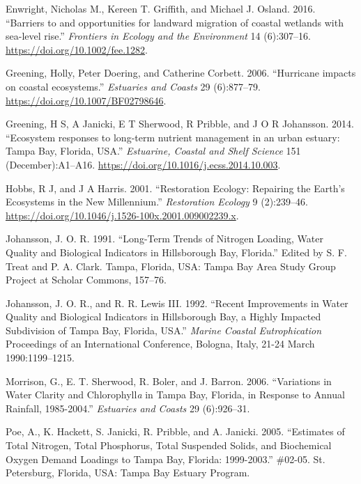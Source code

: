 \documentclass[]{article}
\begin{document}
\leavevmode\hypertarget{ref-Enwright16}{}%
Enwright, Nicholas M., Kereen T. Griffith, and Michael J. Osland. 2016.
``Barriers to and opportunities for landward migration of coastal
wetlands with sea-level rise.'' \emph{Frontiers in Ecology and the
Environment} 14 (6):307--16. \url{https://doi.org/10.1002/fee.1282}.

\leavevmode\hypertarget{ref-Greening06b}{}%
Greening, Holly, Peter Doering, and Catherine Corbett. 2006. ``Hurricane
impacts on coastal ecosystems.'' \emph{Estuaries and Coasts} 29
(6):877--79. \url{https://doi.org/10.1007/BF02798646}.

\leavevmode\hypertarget{ref-Greening2014}{}%
Greening, H S, A Janicki, E T Sherwood, R Pribble, and J O R Johansson.
2014. ``Ecosystem responses to long-term nutrient management in an urban
estuary: Tampa Bay, Florida, USA.'' \emph{Estuarine, Coastal and Shelf
Science} 151 (December):A1--A16.
\url{https://doi.org/10.1016/j.ecss.2014.10.003}.

\leavevmode\hypertarget{ref-Hobbs01}{}%
Hobbs, R J, and J A Harris. 2001. ``Restoration Ecology: Repairing the
Earth's Ecosystems in the New Millennium.'' \emph{Restoration Ecology} 9
(2):239--46. \url{https://doi.org/10.1046/j.1526-100x.2001.009002239.x}.

\leavevmode\hypertarget{ref-Johansson91}{}%
Johansson, J. O. R. 1991. ``Long-Term Trends of Nitrogen Loading, Water
Quality and Biological Indicators in Hillsborough Bay, Florida.'' Edited
by S. F. Treat and P. A. Clark. Tampa, Florida, USA: Tampa Bay Area
Study Group Project at Scholar Commons, 157--76.

\leavevmode\hypertarget{ref-Johansson92}{}%
Johansson, J. O. R., and R. R. Lewis III. 1992. ``Recent Improvements in
Water Quality and Biological Indicators in Hillsborough Bay, a Highly
Impacted Subdivision of Tampa Bay, Florida, USA.'' \emph{Marine Coastal
Eutrophication} Proceedings of an International Conference, Bologna,
Italy, 21-24 March 1990:1199--1215.

\leavevmode\hypertarget{ref-Morrison06}{}%
Morrison, G., E. T. Sherwood, R. Boler, and J. Barron. 2006.
``Variations in Water Clarity and Chlorophyll\emph{a} in Tampa Bay,
Florida, in Response to Annual Rainfall, 1985-2004.'' \emph{Estuaries
and Coasts} 29 (6):926--31.

\leavevmode\hypertarget{ref-Poe05}{}%
Poe, A., K. Hackett, S. Janicki, R. Pribble, and A. Janicki. 2005.
``Estimates of Total Nitrogen, Total Phosphorus, Total Suspended Solids,
and Biochemical Oxygen Demand Loadings to Tampa Bay, Florida:
1999-2003.'' \#02-05. St. Petersburg, Florida, USA: Tampa Bay Estuary
Program.
\end{document}
